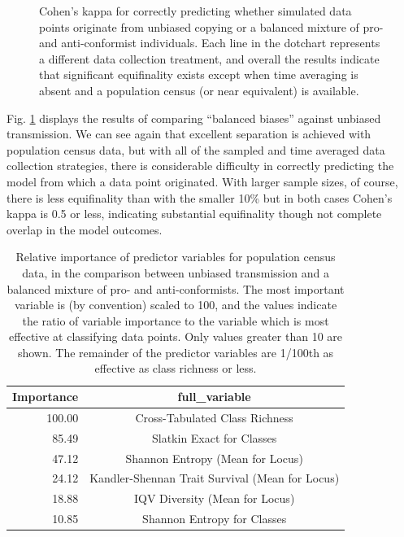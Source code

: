 \documentclass[10pt,letterpaper]{article}
\begin{document}
\begin{figure}[h]
\caption{Cohen's kappa for correctly predicting whether simulated data points originate from unbiased copying or a balanced mixture of pro- and anti-conformist individuals.  Each line in the dotchart represents a different data collection treatment, and overall the results indicate that significant equifinality exists except when time averaging is absent and a population census (or near equivalent) is available.}
\label{fig5}
\end{figure}

Fig. \ref{fig5} displays the results of comparing ``balanced biases'' against unbiased transmission.  We can see again that excellent separation is achieved with population census data, but with all of the sampled and time averaged data collection strategies, there is considerable difficulty in correctly predicting the model from which a data point originated.  With larger sample sizes, of course, there is less equifinality than with the smaller 10\% but in both cases Cohen's kappa is 0.5 or less, indicating substantial equifinality though not complete overlap in the model outcomes.  

\begin{table}[ht]
\begin{tabular}{rc}
  \hline
Importance & full\_variable \\
  \hline
100.00 & Cross-Tabulated Class Richness \\
  85.49 & Slatkin Exact for Classes \\
  47.12 & Shannon Entropy (Mean for Locus) \\
  24.12 & Kandler-Shennan Trait Survival (Mean for Locus) \\
  18.88 & IQV Diversity (Mean for Locus) \\
  10.85 & Shannon Entropy for Classes \\   
  \hline
\end{tabular}
\caption{Relative importance of predictor variables for population census data, in the comparison between unbiased transmission and a balanced mixture of pro- and anti-conformists.  The most important variable is (by convention) scaled to 100, and the values indicate the ratio of variable importance to the variable which is most effective at classifying data points. Only values greater than 10 are shown. The remainder of the predictor variables are 1/100th as effective as class richness or less.}
\label{tab:varimp-balbiased-census}
\end{table}
\end{document}
